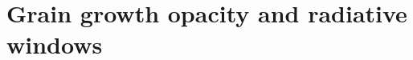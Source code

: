 \documentclass[apj]{emulateapj}
\newcommand{\delad}{\nabla_{\rm ad}}
\begin{document}

%
%
%
%





\section{Grain growth opacity and radiative windows} \label{radwindow}
\end{document}
